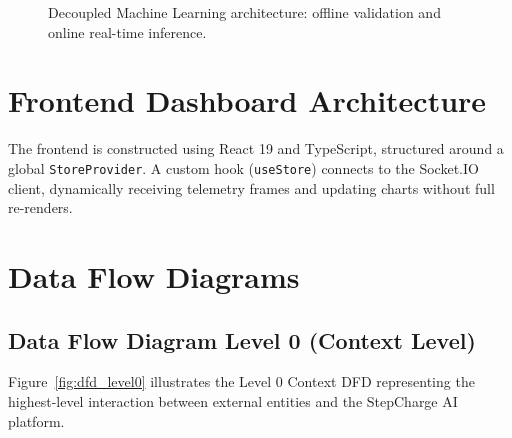 \begin{figure}[H]
\caption{Decoupled Machine Learning architecture: offline validation and online real-time inference.}
\label{fig:ml_workflow}
\end{figure}

\section{Frontend Dashboard Architecture}
The frontend is constructed using React 19 and TypeScript, structured around a global \texttt{StoreProvider}. A custom hook (\texttt{useStore}) connects to the Socket.IO client, dynamically receiving telemetry frames and updating charts without full re-renders.

\section{Data Flow Diagrams}

\subsection{Data Flow Diagram Level 0 (Context Level)}
Figure~\ref{fig:dfd_level0} illustrates the Level 0 Context DFD representing the highest-level interaction between external entities and the StepCharge AI platform.

